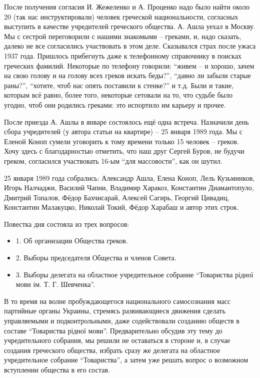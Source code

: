 После получения согласия И. Жежеленко и А. Проценко надо было найти около 20 (так
нас инструктировали) человек греческой национальности, согласных выступить в
качестве учредителей греческого общества. А. Ашла уехал в Москву. Мы с сестрой
переговорили с нашими знакомыми – греками, и, надо сказать, далеко не все
согласились участвовать в этом деле. Сказывался страх после ужаса 1937 года.
Пришлось прибегнуть даже к телефонному справочнику в поисках греческих фамилий.
Некоторые по телефону говорили: \enquote{живем – и хорошо, зачем на свою голову и на
голову всех греков искать беды?}, \enquote{давно ли забыли старые раны?}, \enquote{хотите, чтоб
нас опять поставили к стенке?} и т.д. Были и такие, которым всё равно, более
того, некоторые сетовали на то, что судьбе было угодно, чтоб они родились
греками: это испортило им карьеру и прочее.      

После приезда А. Ашлы в январе состоялось ещё одна встреча. Назначили день сбора
учредителей (у автора статьи на квартире) – 25 января 1989 года. Мы с Еленой
Коноп сумели уговорить к тому времени только 15 человек – греков. Хочу здесь с
благодарностью отметить, что наш друг Сергей Буров, не будучи греком,
согласился участвовать 16-ым \enquote{для массовости}, как он шутил.

25 января 1989 года собрались: Александр Ашла, Елена Коноп, Лель Кузьминков,
Игорь Налчаджи, Василий Чапни, Владимир Харакоз, Константин Диамантопуло,
Дмитрий Топалов, Фёдор Бахчисарай, Алексей Сагирь, Георгий Цивадиц, Константин
Малакуцко, Николай Токий, Фёдор Харабаш и автор этих строк.

Повестка дня состояла из трех вопросов: 

\begin{itemize}
  \item 1. Об организации Общества греков. 
  \item 2. Выборы председателя Общества и членов Совета. 
  \item 3. Выборы делегата на областное учредительное собрание \enquote{Товариства рідної мови ім. Т. Г. Шевченка}.
\end{itemize}

В то время на волне пробуждающегося национального самосознания масс партийные
органы Украины, стремясь развивающиеся движения сделать управляемыми и
подконтрольными, даже содействовали созданию обществ в составе \enquote{Товариства
рідної мови}. Предварительно обсудив эту тему до учредительного собрания, мы
решили не оставаться в стороне и, в случае создания греческого общества,
избрать сразу же делегата на областное учредительное собрание \enquote{Товариства}, а
затем уже решать вопрос о возможном вступлении общества в его состав.

